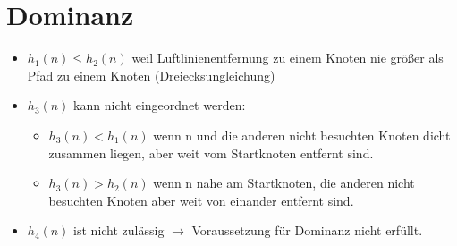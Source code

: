 \documentclass[a4paper,draft=false,oneside,12pt,ngerman]{scrreprt}
\begin{document}
\section{Dominanz}
\label{sec:dominanz}

\begin{itemize}
    \item $ h_1(n) \leq h_2(n) $ weil Luftlinienentfernung zu einem Knoten nie größer als
        Pfad zu einem Knoten (Dreiecksungleichung)

    \item $ h_3(n) $ kann nicht eingeordnet werden:
        \begin{itemize}
            \item $ h_3(n) < h_1(n) $ wenn n und die anderen nicht besuchten Knoten dicht
                zusammen liegen, aber weit vom Startknoten entfernt sind.
            \item $ h_3(n) > h_2(n) $ wenn n nahe am Startknoten, die anderen
                nicht besuchten Knoten aber weit von einander entfernt sind.
        \end{itemize}

    \item $ h_4(n) $ ist nicht zulässig $\rightarrow$ Voraussetzung für Dominanz
        nicht erfüllt.
\end{itemize}




\cleardoublepage{}
\renewcommand*{\chapterpagestyle}{scrheadings}
\renewcommand*{\indexpagestyle}{scrheadings}
\end{document}

